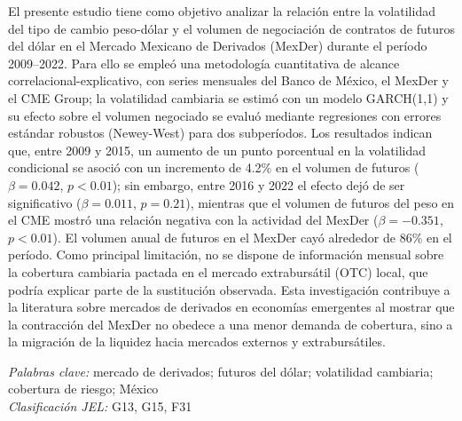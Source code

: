 

El presente estudio tiene como objetivo analizar la relación entre la volatilidad del tipo de cambio peso-dólar y el volumen de negociación de contratos de futuros del dólar en el Mercado Mexicano de Derivados (MexDer) durante el período 2009–2022. Para ello se empleó una metodología cuantitativa de alcance correlacional-explicativo, con series mensuales del Banco de México, el MexDer y el CME Group; la volatilidad cambiaria se estimó con un modelo GARCH(1,1) y su efecto sobre el volumen negociado se evaluó mediante regresiones con errores estándar robustos (Newey-West) para dos subperíodos. Los resultados indican que, entre 2009 y 2015, un aumento de un punto porcentual en la volatilidad condicional se asoció con un incremento de 4.2\% en el volumen de futuros ($\beta = 0.042$, $p < 0.01$); sin embargo, entre 2016 y 2022 el efecto dejó de ser significativo ($\beta = 0.011$, $p = 0.21$), mientras que el volumen de futuros del peso en el CME mostró una relación negativa con la actividad del MexDer ($\beta = -0.351$, $p < 0.01$). El volumen anual de futuros en el MexDer cayó alrededor de 86\% en el período. Como principal limitación, no se dispone de información mensual sobre la cobertura cambiaria pactada en el mercado extrabursátil (OTC) local, que podría explicar parte de la sustitución observada. Esta investigación contribuye a la literatura sobre mercados de derivados en economías emergentes al mostrar que la contracción del MexDer no obedece a una menor demanda de cobertura, sino a la migración de la liquidez hacia mercados externos y extrabursátiles.

\hspace{1.27cm}\textit{Palabras clave:} mercado de derivados; futuros del dólar; volatilidad cambiaria; cobertura de riesgo; México\\
\hspace*{1.27cm}\textit{Clasificación JEL:} G13, G15, F31
